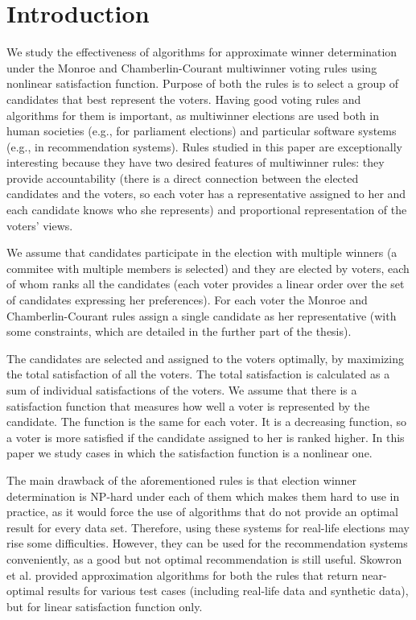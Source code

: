 \chapter{Introduction}
\label{cha:introduction}

We study the effectiveness of algorithms for approximate winner determination under the Monroe \cite{8} and Chamberlin-Courant \cite{9} multiwinner voting rules using nonlinear satisfaction function. Purpose of both the rules is to select a group of candidates that best represent the voters. Having good voting rules and algorithms for them is important, as multiwinner elections are used both in human societies (e.g., for parliament elections) and particular software systems (e.g., in recommendation systems). Rules studied in this paper are exceptionally interesting because they have two desired features of multiwinner rules: they provide accountability (there is a direct connection between the elected candidates and the voters, so each voter has a representative assigned to her and each candidate knows who she represents) and proportional representation of the voters’ views.

We assume that candidates participate in the election with multiple winners (a commitee with multiple members is selected) and they are elected by voters, each of whom ranks all the candidates (each voter provides a linear order over the set of candidates expressing her preferences). For each voter the Monroe and Chamberlin-Courant rules assign a single candidate as her representative (with some constraints, which are detailed in the further part of the thesis).

The candidates are selected and assigned to the voters optimally, by maximizing the total satisfaction of all the voters. The total satisfaction is calculated as a sum of individual satisfactions of the voters. We assume that there is a  satisfaction function that measures how well a voter is represented by the candidate. The function is the same for each voter. It is a decreasing function, so a voter is more satisfied if the candidate assigned to her is ranked higher. In this paper we study cases in which the satisfaction function is a nonlinear one.

The main drawback of the aforementioned rules is that election winner determination is NP-hard under each of them \cite{2} which makes them hard to use in practice, as it would force the use of algorithms that do not provide an optimal result for every data set. Therefore, using these systems for real-life elections may rise some difficulties. However, they can be used for the recommendation systems conveniently, as a good but not optimal recommendation is still useful. Skowron et al. \cite{1} provided approximation algorithms for both the rules that return near-optimal results for various test cases (including real-life data and synthetic data), but for linear satisfaction function only.

